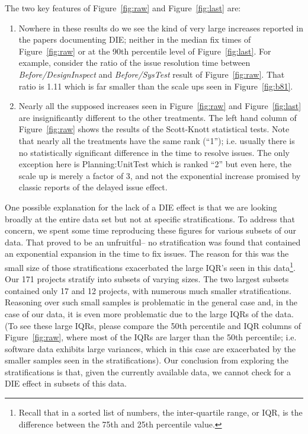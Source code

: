 \documentclass[smallcondensed]{svjour3}
\newcommand{\be}{\begin{enumerate}}
\newcommand{\ee}{\end{enumerate}}
\newcommand{\fig}[1]{Figure~\ref{fig:#1}}
\begin{document}
The two key features of \fig{raw} and  \fig{last} are:
\be
\item Nowhere in
these results do we see the kind of very large increases reported in the papers
documenting DIE; neither in the median fix times of \fig{raw}
or at the 90th percentile level of \fig{last}. For example, consider the ratio of the issue resolution time
between {\em Before/DesignInspect} and {\em Before/SysTest} result of \fig{raw}. That ratio is 1.11 which is far smaller
than the scale ups seen in \fig{b81}.  
\item
Nearly all the supposed increases seen in \fig{raw} and \fig{last} are insignificantly different
to the other treatments.  The left hand column of \fig{raw} shows the results of the Scott-Knott statistical tests. Note that nearly all
the treatments have the same rank (``1''); i.e. usually there is no statistically significant difference in the 
time to resolve issues. The only exception here is Planning:UnitTest which is ranked ``2'' but even here, the scale up is merely
a factor of 3, and not the exponential increase promised by classic reports of the delayed issue effect.
\ee
One possible explanation for the lack of a DIE effect is that we are looking
broadly at the entire data set but not at specific stratifications. To address that concern,
we spent some time reproducing these figures for various subsets of our data.
That proved to be an unfruitful-- no stratification was found that 
contained an exponential expansion in the time to fix issues. The reason for this was  the small size
of those stratifications  exacerbated the large IQR's seen in this data\footnote{Recall that in a sorted list of numbers,
the inter-quartile range, or IQR, is the difference between the 
  75th and 25th percentile value.}.
Our 171 projects   stratify into subsets of varying sizes. 
The two largest subsets contained only 17 and 12 projects, with numerous much smaller stratifications.
Reasoning over such small samples
is problematic in the general case and, in the case of our data, it is even more problematic due to
the large IQRs of the data.
(To see these large IQRs,  please compare the 50th percentile and IQR columns of Figure~\ref{fig:raw}, where  most of the IQRs are larger than the 50th percentile; i.e. software
data exhibits large variances, which in this case are exacerbated by the smaller samples seen in the stratifications).
Our conclusion from exploring the stratifications is that, given the currently available data, we cannot check
for a DIE effect in subsets of this data.
\end{document}
